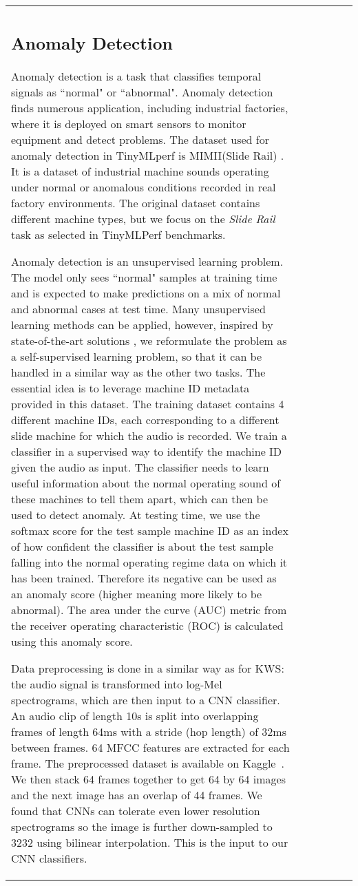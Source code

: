 \documentclass{article}
\begin{document}
\begin{table}[t]
\begin{tabular}{l| c | c | c | c | c}
\subsection{Anomaly Detection}
Anomaly detection is a task that classifies temporal signals as ``normal" or ``abnormal". Anomaly detection finds numerous application, including industrial factories, where it is deployed on smart sensors to monitor equipment and detect problems. 
The dataset used for anomaly detection in TinyMLperf is MIMII(Slide Rail) \cite{purohit2019mimii}.
It is a dataset of industrial machine sounds operating under normal or anomalous conditions recorded in real factory environments. The original dataset contains different machine types, but we focus on the \textit{Slide Rail} task as selected in TinyMLPerf benchmarks. 

Anomaly detection is an unsupervised learning problem. The model only sees ``normal" samples at training time and is expected to make predictions on a mix of normal and abnormal cases at test time. Many unsupervised learning methods can be applied, however, inspired by state-of-the-art solutions \cite{Giri2020}, we reformulate the problem as a self-supervised \cite{hendrycks2019using} learning problem, so that it can be handled in a similar way as the other two tasks.
The essential idea is to leverage machine ID metadata provided in this dataset. The training dataset contains 4 different machine IDs, each corresponding to a different slide machine for which the audio is recorded. We train a classifier in a supervised way to identify the machine ID given the audio as input. The classifier needs to learn useful information about the normal operating sound of these machines to tell them apart, which can then be used to detect anomaly. At testing time, we use the softmax score for the test sample machine ID as an index of how confident the classifier is about the test sample falling into the normal operating regime data on which it has been trained. Therefore its negative can be used as an anomaly score (higher meaning more likely to be abnormal). The area under the curve (AUC) metric from the receiver operating characteristic (ROC) is calculated using this anomaly score.


Data preprocessing is done in a similar way as for KWS: the audio signal is transformed into log-Mel spectrograms, which are then input to a CNN classifier. An audio clip of length 10s is split into overlapping frames of length 64ms with a stride (hop length) of 32ms between frames. 64 MFCC features are extracted for each frame. The preprocessed dataset is available on Kaggle~\cite{kaggle-ad}.
We then stack 64 frames together to get 64 by 64 images and the next image has an overlap of 44 frames. We found that CNNs can tolerate even lower resolution spectrograms so the image is further down-sampled to 3232 using bilinear interpolation. This is the input to our CNN classifiers.




\end{tabular}
\end{table}
\end{document}
